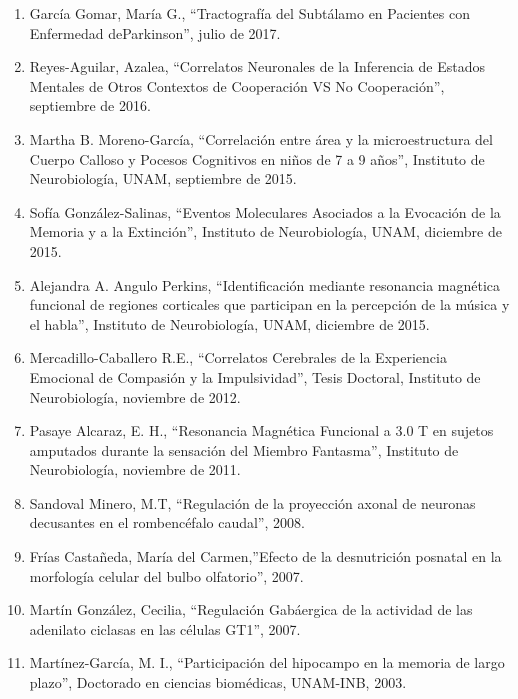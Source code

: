 \begin{enumerate}
\item García Gomar, María G., “Tractografía del Subtálamo en Pacientes con Enfermedad deParkinson”, julio de 2017.

\item Reyes-Aguilar, Azalea, “Correlatos Neuronales de la Inferencia de Estados Mentales de Otros Contextos de Cooperación VS No 
Cooperación”, 
septiembre de 2016.

\item Martha B. Moreno-García, “Correlación entre área y la microestructura del Cuerpo Calloso y Pocesos Cognitivos en niños de 7 a 9 años”, 
Instituto de Neurobiología, UNAM, septiembre de 2015.

\item Sofía González-Salinas, “Eventos Moleculares Asociados a la Evocación de la Memoria y a la Extinción”, Instituto de Neurobiología, 
UNAM, 
diciembre de 2015.

\item Alejandra A. Angulo Perkins, “Identificación mediante resonancia magnética funcional de regiones corticales que participan en la 
percepción 
de la música y el habla”, Instituto de Neurobiología, UNAM, diciembre de 2015.

\item Mercadillo-Caballero R.E., “Correlatos Cerebrales de la Experiencia Emocional de Compasión y la Impulsividad”, Tesis Doctoral, 
Instituto de 
Neurobiología, noviembre de 2012.

\item Pasaye Alcaraz, E. H., “Resonancia Magnética Funcional a 3.0 T en sujetos amputados durante la sensación del Miembro Fantasma”, 
Instituto de 
Neurobiología, noviembre de 2011.

\item Sandoval Minero, M.T, “Regulación de la proyección axonal de neuronas decusantes en el rombencéfalo caudal”, 2008.

\item Frías Castañeda, María del Carmen,”Efecto de la desnutrición posnatal en la morfología celular del bulbo olfatorio”, 2007.

\item Martín González, Cecilia, “Regulación Gabáergica de la actividad de las adenilato ciclasas en las células GT1”, 2007.

\item Martínez-García, M. I., “Participación del hipocampo en la memoria de largo plazo”, Doctorado en ciencias biomédicas, UNAM-INB, 2003.

\end{enumerate}

